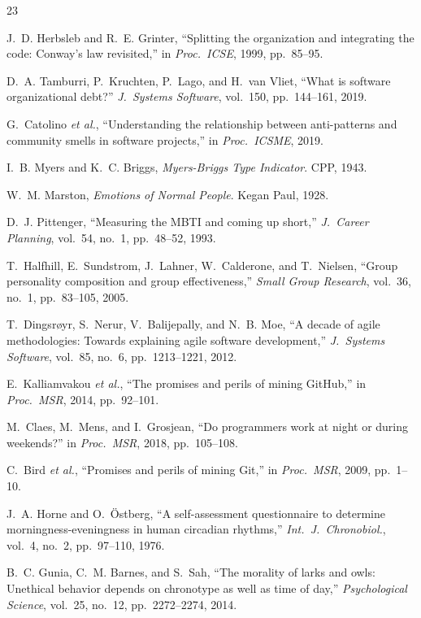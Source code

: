 \documentclass[conference]{IEEEtran}
\begin{document}
\begin{thebibliography}{23}

J.~D. Herbsleb and R.~E. Grinter, ``Splitting the organization and
integrating the code: Conway's law revisited,'' in \textit{Proc.\
ICSE}, 1999, pp.~85--95.

D.~A. Tamburri, P.~Kruchten, P.~Lago, and H.~van Vliet, ``What is
software organizational debt?'' \textit{J.\ Systems Software},
vol.~150, pp.~144--161, 2019.

G.~Catolino \textit{et al.}, ``Understanding the relationship between
anti-patterns and community smells in software projects,'' in
\textit{Proc.\ ICSME}, 2019.

I.~B. Myers and K.~C. Briggs, \textit{Myers-Briggs Type Indicator}.
CPP, 1943.

W.~M. Marston, \textit{Emotions of Normal People}. Kegan Paul, 1928.

D.~J. Pittenger, ``Measuring the MBTI and coming up short,''
\textit{J.\ Career Planning}, vol.~54, no.~1, pp.~48--52, 1993.

T.~Halfhill, E.~Sundstrom, J.~Lahner, W.~Calderone, and T.~Nielsen,
``Group personality composition and group effectiveness,''
\textit{Small Group Research}, vol.~36, no.~1, pp.~83--105, 2005.

T.~Dingsr\o{}yr, S.~Nerur, V.~Balijepally, and N.~B. Moe,
``A decade of agile methodologies: Towards explaining agile software
development,'' \textit{J.\ Systems Software}, vol.~85, no.~6,
pp.~1213--1221, 2012.

E.~Kalliamvakou \textit{et al.}, ``The promises and perils of mining
GitHub,'' in \textit{Proc.\ MSR}, 2014, pp.~92--101.

M.~Claes, M.~Mens, and I.~Grosjean, ``Do programmers work at night
or during weekends?'' in \textit{Proc.\ MSR}, 2018, pp.~105--108.

C.~Bird \textit{et al.}, ``Promises and perils of mining Git,'' in
\textit{Proc.\ MSR}, 2009, pp.~1--10.

J.~A. Horne and O.~\"{O}stberg, ``A self-assessment questionnaire to
determine morningness-eveningness in human circadian rhythms,''
\textit{Int.\ J.\ Chronobiol.}, vol.~4, no.~2, pp.~97--110, 1976.

B.~C. Gunia, C.~M. Barnes, and S.~Sah, ``The morality of larks and
owls: Unethical behavior depends on chronotype as well as time of
day,'' \textit{Psychological Science}, vol.~25, no.~12,
pp.~2272--2274, 2014.


\end{thebibliography}
\end{document}
